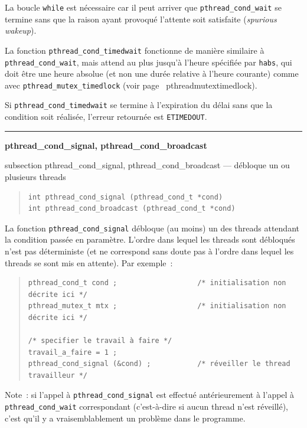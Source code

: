 \documentclass [twoside] {report}
\newcommand {\primitive} [1]
    {
	\phantomsection
	{\large \textbf {#1}}
	\addcontentsline {toc} {subsection} {#1}
    }
\newcommand {\separation}
    {
	\vspace {5mm}
	\nopagebreak
	\hrule
    }
\begin{document}
La boucle \texttt {while} est nécessaire car il peut arriver que
\verb|pthread_cond_wait| se termine sans que la raison ayant provoqué
l'attente soit satisfaite (\textit {spurious wakeup}).

La fonction \verb|pthread_cond_timedwait| fonctionne de manière
similaire à \verb|pthread_cond_wait|, mais attend au plus
jusqu'à l'heure spécifiée par \texttt {habs}, qui doit être
une heure absolue (et non une durée relative à l'heure courante)
comme avec \verb|pthread_mutex_timedlock| (voir page~\pageref
{pthreadmutextimedlock}).

Si \verb|pthread_cond_timedwait| se termine à l'expiration du délai
sans que la condition soit réalisée, l'erreur retournée est \texttt
{ETIMEDOUT}.


\separation
\primitive {pthread\_cond\_signal, pthread\_cond\_broadcast} --- débloque un ou plusieurs threads

\begin {quote}
\begin {verbatim}
int pthread_cond_signal (pthread_cond_t *cond)
int pthread_cond_broadcast (pthread_cond_t *cond)
\end{verbatim}
\end {quote}

La fonction \verb|pthread_cond_signal| débloque (au moins) un des threads
attendant la condition passée en paramètre. L'ordre dans lequel les
threads sont débloqués n'est pas déterministe (et ne correspond sans
doute pas à l'ordre dans lequel les threads se sont mis en attente).
Par exemple~:

\begin {quote}
\small
\begin {verbatim}
pthread_cond_t cond ;                   /* initialisation non décrite ici */
pthread_mutex_t mtx ;                   /* initialisation non décrite ici */

/* specifier le travail à faire */
travail_a_faire = 1 ;
pthread_cond_signal (&cond) ;           /* réveiller le thread travailleur */
\end{verbatim}
\end {quote}

Note~: si l'appel à \verb|pthread_cond_signal| est effectué
antérieurement à l'appel à \verb|pthread_cond_wait| correspondant
(c'est-à-dire si aucun thread n'est réveillé), c'est qu'il y a
vraisemblablement un problème dans le programme.
\end{document}
